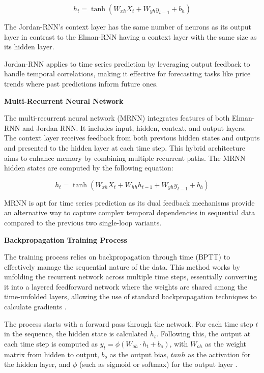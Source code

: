 \documentclass[conference, 10pt]{IEEEtran}
\begin{document}
$$h_t = \tanh(W_{xh}X_t + W_{yh}y_{t-1} + b_h)$$

The Jordan-RNN's context layer has the same number of neurons as its output layer in contrast to the Elman-RNN having a
context layer with the same size as its hidden layer.

Jordan-RNN applies to time series prediction by leveraging output feedback to handle temporal correlations, making it
effective for forecasting tasks like price trends where past predictions inform future ones.

\textbf{Multi-Recurrent Neural Network }

The multi-recurrent neural network (MRNN) integrates features of both Elman-RNN and Jordan-RNN. It includes input,
hidden, context, and output layers. The context layer receives feedback from both previous hidden states and
outputs and presented to the hidden layer at each time step. This hybrid architecture aims to enhance memory by combining multiple
recurrent paths. The MRNN hidden states are computed by the following equation: 

$$h_t = \tanh(W_{xh}X_t + W_{hh}h_{t-1} + W_{yh}y_{t-1} + b_h)$$

MRNN is apt for time series prediction as its dual feedback mechanisms provide an alternative way to capture complex
temporal dependencies in sequential data compared to the previous two single-loop variants.


\textbf{Backpropagation Training Process} 

The training process relies on backpropagation through time (BPTT) to effectively manage the sequential nature of the
data. This method works by unfolding the recurrent network across multiple time steps, essentially converting it into a
layered feedforward network where the weights are shared among the time-unfolded layers, allowing the use of standard
backpropagation techniques to calculate gradients \cite{quarkmlBackpropagationThrough}.

The process starts with a forward pass through the network. For each time step $t$ in the sequence, the hidden state is
calculated \( h_t \).
Following this, the output at each time step is
computed as \( y_t = \phi(W_{oh} \cdot h_t + b_o) \), with \( W_{oh} \) as the weight matrix from hidden to output, \(
b_o \) as the output bias, $tanh$ as the activation for the hidden layer, and \( \phi \) (such as sigmoid or softmax) for
the output layer \cite{quarkmlBackpropagationThrough}.
\end{document}
